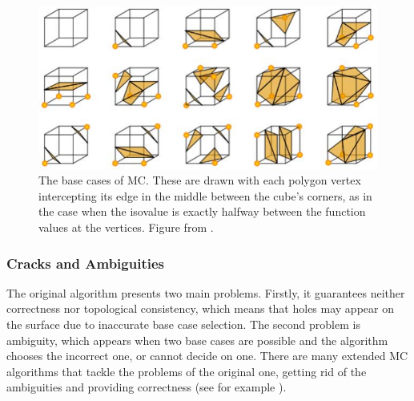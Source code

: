 \begin{figure}
\centering
   \includegraphics[width=.5\textwidth]{Pictures/cubes.pdf}
   \caption{The base cases of \ac{MC}. These are drawn with each polygon vertex intercepting its edge in the middle between the cube's corners, as in the case when the isovalue is exactly halfway between the function values at the vertices. Figure from \cite{Marching2006}.}
   \label{fig:MC_basecase}
\end{figure}

\subsubsection{Cracks and Ambiguities}
The original algorithm presents two main problems. Firstly, it guarantees neither correctness nor topological consistency, which means that holes may appear on the surface due to inaccurate base case selection. The second problem is ambiguity, which appears when two base cases are possible and the algorithm chooses the incorrect one, or cannot decide on one. There are many extended \ac{MC} algorithms that tackle the problems of the original one, getting rid of the ambiguities and providing correctness (see for example \cite{ExtendedMC}).
